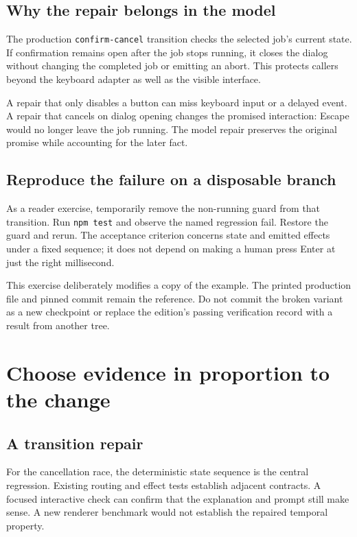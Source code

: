 \subsection{Why the repair belongs in the model}

The production \texttt{confirm-cancel} transition checks the selected job's current state. If confirmation remains open after the job stops running, it closes the dialog without changing the completed job or emitting an abort. This protects callers beyond the keyboard adapter as well as the visible interface.

A repair that only disables a button can miss keyboard input or a delayed event. A repair that cancels on dialog opening changes the promised interaction: Escape would no longer leave the job running. The model repair preserves the original promise while accounting for the later fact.

\subsection{Reproduce the failure on a disposable branch}

As a reader exercise, temporarily remove the non-running guard from that transition. Run \texttt{npm test} and observe the named regression fail. Restore the guard and rerun. The acceptance criterion concerns state and emitted effects under a fixed sequence; it does not depend on making a human press Enter at just the right millisecond.

This exercise deliberately modifies a copy of the example. The printed production file and pinned commit remain the reference. Do not commit the broken variant as a new checkpoint or replace the edition's passing verification record with a result from another tree.

\section{Choose evidence in proportion to the change}
\subsection{A transition repair}

For the cancellation race, the deterministic state sequence is the central regression. Existing routing and effect tests establish adjacent contracts. A focused interactive check can confirm that the explanation and prompt still make sense. A new renderer benchmark would not establish the repaired temporal property.

